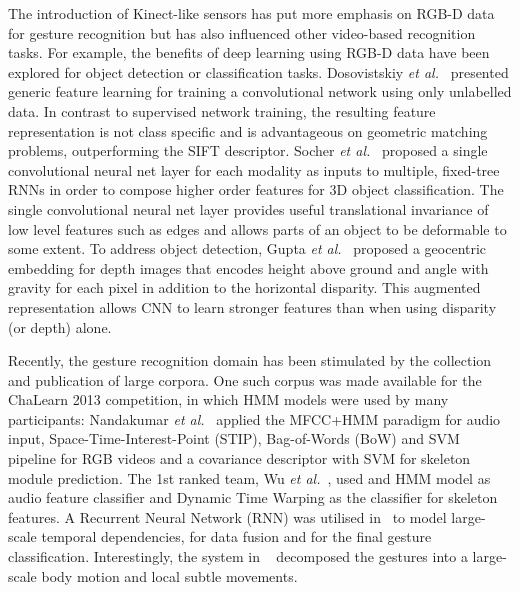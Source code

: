 The introduction of  Kinect-like sensors has put more emphasis on RGB-D data for gesture recognition but has also influenced other video-based recognition tasks.
For example, the benefits of deep learning using RGB-D data have been explored for object detection or classification tasks.
%
Dosovistskiy \emph{et al.}~\cite{DosovitskiySRB14} presented generic feature learning for training a convolutional network using only unlabelled data. In contrast to supervised network training, the resulting feature representation is not class specific and is advantageous on geometric matching problems, outperforming the SIFT descriptor.
Socher \emph{et al.}~\cite{socher2012convolutional} proposed a single convolutional neural net layer for each modality as inputs to multiple, fixed-tree RNNs in order to compose higher order features for 3D object classification. The single convolutional neural net layer provides useful translational invariance of low level features such as edges and allows parts of an object to be deformable to some extent.
To address object detection, Gupta \emph{et al.}~\cite{gupta2014learning} proposed a geocentric embedding for depth images that encodes height above ground and angle with gravity for each pixel in addition to the horizontal disparity.
This augmented representation allows CNN to learn stronger features than when using disparity (or depth) alone.

Recently, the gesture recognition domain has been stimulated by the collection and publication of large corpora.
One such corpus was made available for the ChaLearn 2013 competition, in which HMM models were used by many participants:
Nandakumar \emph{et al.}~\cite{nandakumar2013multi} applied the MFCC+HMM paradigm for audio input, Space-Time-Interest-Point (STIP), Bag-of-Words (BoW) and SVM pipeline for RGB videos and a covariance descriptor with SVM for skeleton module prediction. The 1st ranked team, Wu \emph{et al.}~\cite{wu2013fusing}, used and HMM model as audio feature classifier and Dynamic Time Warping as the classifier for skeleton features.  A Recurrent Neural Network (RNN) was utilised in~\cite{neverova2013multi} to model large-scale temporal dependencies, for data fusion and for the final gesture classification.  Interestingly, the system in ~\cite{neverova2013multi} decomposed the gestures into a large-scale body motion and local subtle movements.

